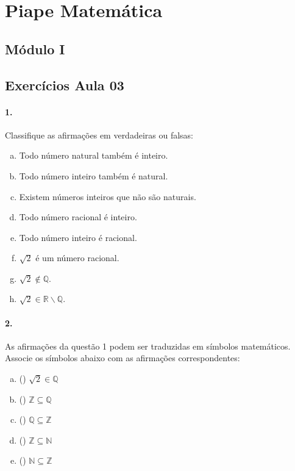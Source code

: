 \documentclass[a4paper,twocolumn,12pt]{article}
\begin{document}
 
\section*{Piape Matemática} 
 
\subsection*{Módulo I}
\subsection*{Exercícios Aula 03}

\paragraph{1.} Classifique as afirmações em verdadeiras ou falsas:
\begin{enumerate}[a)]
\item Todo número natural também é inteiro. 
\item Todo número inteiro também é natural.  
\item Existem números inteiros que não são naturais.
\item Todo número racional é inteiro. 
\item Todo número inteiro é racional.
\item $\sqrt{2}$ é um número racional.
\item $\sqrt{2} \notin \mathbb{Q}$.
\item $\sqrt{2} \in \mathbb{R\backslash Q}$.
\end{enumerate}


\paragraph*{2. } As afirmações da questão 1 podem ser traduzidas em símbolos matemáticos. Associe os símbolos abaixo com as afirmações correspondentes:
\begin{enumerate}[a)]
  \item (\hspace{7mm}) $\sqrt{2} \in \mathbb{Q}$ 
  \item (\hspace{7mm}) $\mathbb{Z} \subseteq \mathbb{Q}$
  \item (\hspace{7mm}) $\mathbb{Q} \subseteq \mathbb{Z}$
  \item (\hspace{7mm}) $\mathbb{Z} \subseteq \mathbb{N}$
  \item (\hspace{7mm}) $\mathbb{N} \subseteq \mathbb{Z}$
\end{enumerate}
\end{document}
